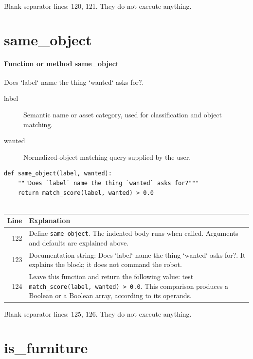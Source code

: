\documentclass[11pt,a4paper]{book}
\begin{document}
Blank separator lines: 120, 121. They do not execute anything.

\section{same\_object}

\paragraph{Function or method same\_object}
Does `label` name the thing `wanted` asks for?.

\begin{description}
\item[label] Semantic name or asset category, used for classification and object matching.
\item[wanted] Normalized-object matching query supplied by the user.
\end{description}

\begin{lstlisting}[firstnumber=122]
def same_object(label, wanted):
    """Does `label` name the thing `wanted` asks for?"""
    return match_score(label, wanted) > 0.0


\end{lstlisting}

\begin{longtable}{r p{}}

\textbf{Line} & \textbf{Explanation} \\ \hline \endhead

122 & Define \texttt{same\_object}. The indented body runs when called. Arguments and defaults are explained above. \\

123 & Documentation string: Does `label` name the thing `wanted` asks for?. It explains the block; it does not command the robot. \\

124 & Leave this function and return the following value: test \texttt{match\_score(label, wanted) > 0.0}. This comparison produces a Boolean or a Boolean array, according to its operands. \\

\end{longtable}

Blank separator lines: 125, 126. They do not execute anything.

\section{is\_furniture}
\end{document}
